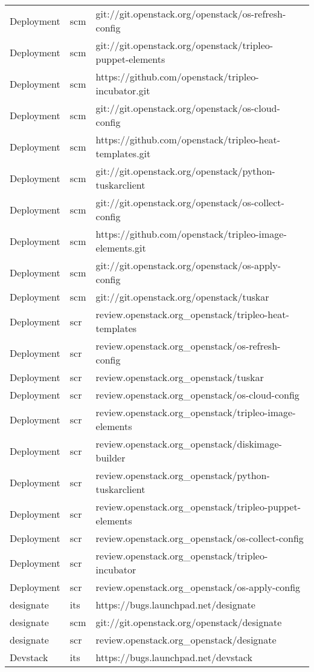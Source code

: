 \begin{center}
\begin{longtable}{|p{4cm}|p{1cm}|p{10cm}|}
Deployment&scm&git://git.openstack.org/openstack/os-refresh-config\\ 
Deployment&scm&git://git.openstack.org/openstack/tripleo-puppet-elements\\ 
Deployment&scm&https://github.com/openstack/tripleo-incubator.git\\ 
Deployment&scm&git://git.openstack.org/openstack/os-cloud-config\\ 
Deployment&scm&https://github.com/openstack/tripleo-heat-templates.git\\ 
Deployment&scm&git://git.openstack.org/openstack/python-tuskarclient\\ 
Deployment&scm&git://git.openstack.org/openstack/os-collect-config\\ 
Deployment&scm&https://github.com/openstack/tripleo-image-elements.git\\ 
Deployment&scm&git://git.openstack.org/openstack/os-apply-config\\ 
Deployment&scm&git://git.openstack.org/openstack/tuskar\\ 
Deployment&scr&review.openstack.org\_openstack/tripleo-heat-templates\\ 
Deployment&scr&review.openstack.org\_openstack/os-refresh-config\\ 
Deployment&scr&review.openstack.org\_openstack/tuskar\\ 
Deployment&scr&review.openstack.org\_openstack/os-cloud-config\\ 
Deployment&scr&review.openstack.org\_openstack/tripleo-image-elements\\ 
Deployment&scr&review.openstack.org\_openstack/diskimage-builder\\ 
Deployment&scr&review.openstack.org\_openstack/python-tuskarclient\\ 
Deployment&scr&review.openstack.org\_openstack/tripleo-puppet-elements\\ 
Deployment&scr&review.openstack.org\_openstack/os-collect-config\\ 
Deployment&scr&review.openstack.org\_openstack/tripleo-incubator\\ 
Deployment&scr&review.openstack.org\_openstack/os-apply-config\\ 
designate&its&https://bugs.launchpad.net/designate\\ 
designate&scm&git://git.openstack.org/openstack/designate\\ 
designate&scr&review.openstack.org\_openstack/designate\\ 
Devstack&its&https://bugs.launchpad.net/devstack\\ 

\end{longtable}
\end{center}
